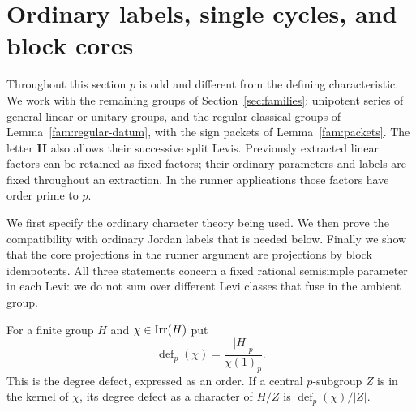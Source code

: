 \section{Ordinary labels, single cycles, and block cores}\label{sec:labels}

Throughout this section $p$ is odd and different from the defining
characteristic.  We work with the remaining groups of
Section~\ref{sec:families}: unipotent series of general linear or unitary
groups, and the regular classical groups of
Lemma~\ref{fam:regular-datum}, with the sign packets of
Lemma~\ref{fam:packets}.  The letter $\mathbf H$ also allows their
successive split Levis.  Previously extracted linear factors can be
retained as fixed factors; their ordinary parameters and labels are
fixed throughout an extraction.  In the runner applications those
factors have order prime to $p$.

We first specify the ordinary character theory being used.  We then
prove the compatibility with ordinary Jordan labels that is needed
below.  Finally we show that the core projections in the runner
argument are projections by block idempotents.  All three statements
concern a fixed rational semisimple parameter in each Levi: we do not
sum over different Levi classes that fuse in the ambient group.

For a finite group $H$ and $\chi\in\operatorname{Irr}(H)$ put
\[
 \operatorname{def}_p(\chi)=\frac{|H|_p}{\chi(1)_p}.
\]
This is the degree defect, expressed as an order.  If a central
$p$-subgroup $Z$ is in the kernel of $\chi$, its degree defect as a
character of $H/Z$ is $\operatorname{def}_p(\chi)/|Z|$.

